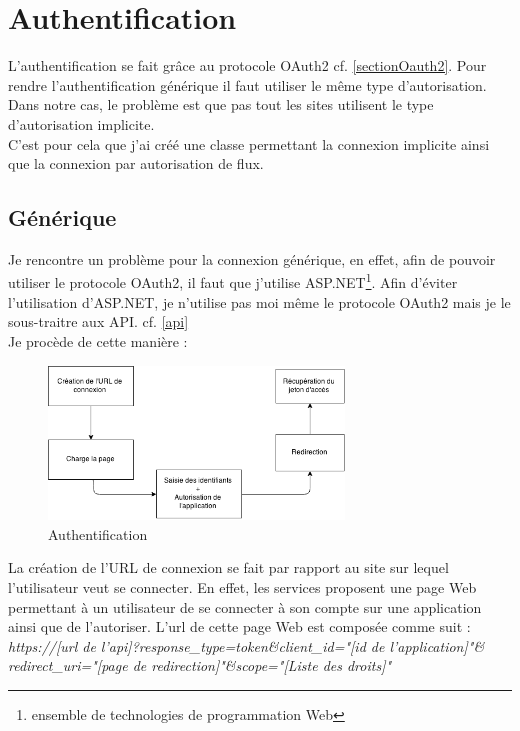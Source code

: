 \documentclass[11pt]{report} %
\begin{document}
	\newpage
	\section{Authentification}
	L'authentification se fait grâce au protocole OAuth2 cf. \ref{sectionOauth2}. Pour rendre l'authentification générique il faut utiliser le même type d'autorisation. Dans notre cas, le problème est que pas tout les sites utilisent le type d'autorisation implicite.\\
	C'est pour cela que j'ai créé une classe permettant la connexion implicite ainsi que la connexion par autorisation de flux.
	
	\subsection{Générique}
	Je rencontre un problème pour la connexion générique, en effet, afin de pouvoir utiliser le protocole OAuth2, il faut que j'utilise ASP.NET\footnote{ensemble de technologies de programmation Web}. 
	Afin d'éviter l'utilisation d'ASP.NET, je n'utilise pas moi même le protocole OAuth2 mais je le sous-traitre aux API. cf. \ref{api}\\
	Je procède de cette manière :
	
			\begin{figure}[h]
				\center
				\includegraphics[width=0.7\textwidth]{../img/auth.png}
				\caption{Authentification}
				\label{authentification}
			\end{figure}
	
	
	La création de l'URL de connexion se fait par rapport au site sur lequel l'utilisateur veut se connecter. En effet, les services proposent une page Web permettant à un utilisateur de se connecter à son compte sur une application ainsi que de l'autoriser.
	L'url de cette page Web est composée comme suit : \\
	
	\textit{https://[url de l'api]?response\_type=token\&client\_id="[id de l'application]"\& redirect\_uri="[page de redirection]"\&scope="[Liste des droits]"}\\
	
\end{document}
